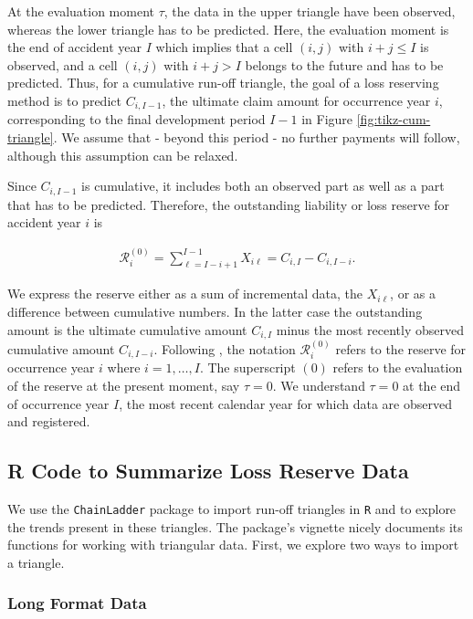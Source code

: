 \documentclass[]{book}
\begin{document}
At the evaluation moment \(\tau\), the data in the upper triangle have
been observed, whereas the lower triangle has to be predicted. Here, the
evaluation moment is the end of accident year \(I\) which implies that a
cell \((i,j)\) with \(i+j \leq I\) is observed, and a cell \((i,j)\)
with \(i+j > I\) belongs to the future and has to be predicted. Thus,
for a cumulative run-off triangle, the goal of a loss reserving method
is to predict \(C_{i,I-1}\), the ultimate claim amount for occurrence
year \(i\), corresponding to the final development period \(I-1\) in
Figure \ref{fig:tikz-cum-triangle}. We assume that - beyond this period
- no further payments will follow, although this assumption can be
relaxed.

Since \(C_{i,I-1}\) is cumulative, it includes both an observed part as
well as a part that has to be predicted. Therefore, the outstanding
liability or loss reserve for accident year \(i\) is

\begin{eqnarray*}
\mathcal{R}^{(0)}_{i} = \sum_{\ell=I-i+1}^{I-1} X_{i\ell} = C_{i,I}-C_{i,I-i}.
\end{eqnarray*}

We express the reserve either as a sum of incremental data, the
\(X_{i\ell}\), or as a difference between cumulative numbers. In the
latter case the outstanding amount is the ultimate cumulative amount
\(C_{i,I}\) minus the most recently observed cumulative amount
\(C_{i,I-i}\). Following \citet{WuthrichMerz2015}, the notation
\(\mathcal{R}^{(0)}_{i}\) refers to the reserve for occurrence year
\(i\) where \(i=1,\ldots,I\). The superscript \((0)\) refers to the
evaluation of the reserve at the present moment, say \(\tau = 0\). We
understand \(\tau = 0\) at the end of occurrence year \(I\), the most
recent calendar year for which data are observed and registered.

\subsection{R Code to Summarize Loss Reserve Data}\label{S:Rcode}

We use the \texttt{ChainLadder} package \citep{R-chainladder} to import
run-off triangles in \texttt{R} and to explore the trends present in
these triangles. The package's vignette nicely documents its functions
for working with triangular data. First, we explore two ways to import a
triangle.

\subsubsection*{Long Format Data}\label{long-format-data}
\end{document}
